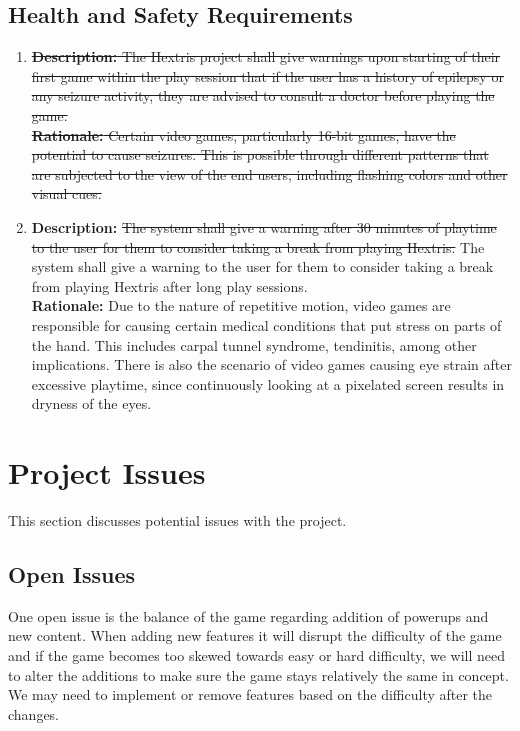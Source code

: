 \documentclass[12pt, titlepage]{article}
\begin{document}
\subsection{Health and Safety Requirements}
\begin{enumerate}[label=HS\arabic*]

\item \sout{\textbf{Description:} The Hextris project shall give warnings upon starting of their first game within the play session that if the user has a history of epilepsy or any seizure activity, they are advised to consult a doctor before playing the game. \\
\textbf{Rationale:} Certain video games, particularly 16-bit games, have the potential to cause seizures. This is possible through different patterns that are subjected to the view of the end users, including flashing colors and other visual cues. }


\item \textbf{Description:} \sout{The system shall give a warning after 30 minutes of playtime to the user for them to consider taking a break from playing Hextris.} {\color{blue}The system shall give a warning to the user for them to consider taking a break from playing Hextris after long play sessions.}\\
\textbf{Rationale:} Due to the nature of repetitive motion, video games are responsible for causing certain medical conditions that put stress on parts of the hand. This includes carpal tunnel syndrome, tendinitis, among other implications. There is also the scenario of video games causing eye strain after excessive playtime, since continuously looking at a pixelated screen results in dryness of the eyes.


\end{enumerate}




\section{Project Issues}
This section discusses potential issues with the project.

\subsection{Open Issues}
One open issue is the balance of the game regarding addition of powerups and new content. When adding new features it will disrupt the difficulty of the game and if the game becomes too skewed towards easy or hard difficulty, we will need to alter the additions to make sure the game stays relatively the same in concept. We may need to implement or remove features based on the difficulty after the changes. 
\end{document}
